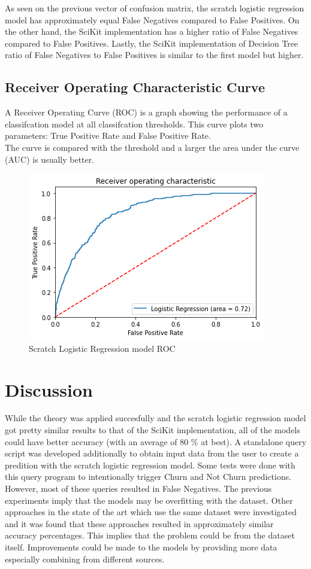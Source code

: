 \documentclass[letterpaper, 10 pt, conference]{ieeeconf}
\begin{document}
As seen on the previous vector of confusion matrix, the scratch logistic regression model has approximately equal False Negatives compared to False Positives.
On the other hand, the SciKit implementation has a higher ratio of False Negatives compared to False Positives.
Lastly, the SciKit implementation of Decision Tree ratio of False Negatives to False Positives is similar to the first model but higher. 

\subsection{Receiver Operating Characteristic Curve}

A Receiver Operating Curve (ROC) is a graph showing the performance of a classifcation model at all classifcation thresholds. This curve
plots two parameters: True Positive Rate and False Positive Rate. \\

The curve is compared with the threshold and a larger the area under the curve (AUC) is usually better.

\begin{figure}[thpb]
    \centering
    \includegraphics[scale=0.5]{figures/LOR.png}
    \caption{Scratch Logistic Regression model ROC}
    \label{LOR}
 \end{figure}

 
\section{ Discussion }
While the theory was applied succesfully and the scratch logistic regression model got pretty similar results to that of the SciKit implementation,
all of the models could have better accuracy (with an average of 80 \% at best). A standalone query script was developed additionally to 
obtain input data from the user to create a predition with the scratch logistic regression model. Some tests were done with this query program
to intentionally trigger Churn and Not Churn predictions. However, most of these queries resulted in False Negatives. The previous experiments 
imply that the models may be overfitting with the dataset. Other approaches in the state of the art which use the same dataset were investigated and it was found
that these approaches resulted in approximately similar accuracy percentages. This implies that the problem could be from the dataset itself. 
Improvements could be made to the models by providing more data especially combining from different sources.
\end{document}
